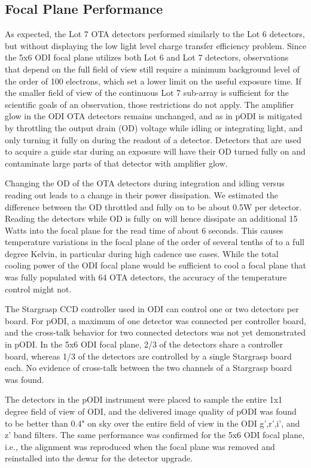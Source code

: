 \documentclass[]{spieman}
\begin{document}
\subsection{Focal Plane  Performance}


As expected, the Lot 7 OTA detectors performed similarly to the Lot 6 detectors, but without
displaying the low light level charge transfer efficiency problem. Since the 5x6
ODI focal plane utilizes both Lot 6 and Lot 7 detectors, observations that
depend on the full field of view still require a minimum background level of the
order of 100 electrons, which set a lower limit on the useful exposure time. If
the smaller field of view of the continuous Lot 7 sub-array is sufficient for the
scientific goals of an observation, those
restrictions do not apply. The amplifier glow in the ODI OTA detectors remains
unchanged, and as in pODI is mitigated by throttling the output drain  (OD) voltage
while idling or integrating light,  and only turning it fully on during the readout
of a detector. Detectors that are used to acquire a guide star during an exposure 
will have their OD turned fully on and contaminate large parts of that detector 
with amplifier glow.

Changing the OD of the OTA detectors during integration and idling versus reading out
leads to a change in their power dissipation. We estimated the difference
between the OD throttled and fully on to be about 0.5W per detector. Reading
the detectors while OD is fully on will hence dissipate an additional 15 Watts
into the focal plane for the read time of about 6 seconds. This causes
temperature variations in the focal plane of the order of several  tenths of
to a full degree Kelvin, in particular during high cadence use cases. While
the total cooling power of the ODI focal plane would be sufficient to cool a
focal plane that was fully populated with 64 OTA detectors, the accuracy of the
temperature control might not.


The Stargrasp CCD controller\cite{onaka2008} used in ODI can control one or two
detectors per board. For pODI, a maximum of one detector was connected per controller 
board, and the cross-talk behavior for two connected detectors was not yet demonstrated
in pODI. In the 5x6 ODI focal plane, 2/3 of the detectors share a controller
board, whereas 1/3 of the detectors are controlled by a single Stargrasp board
each. No evidence of cross-talk between the two channels of a Stargrasp board
was found.

The detectors in the pODI instrument were placed to sample the entire 1x1 degree
field of view of ODI, and the delivered image quality of pODI was found to be
better than 0.4" on sky over the entire field of view in the ODI g',r',i', and
z' band filters. The same performance was confirmed for the 5x6 ODI focal plane,
i.e., the alignment was reproduced when the focal plane was removed and
reinstalled into the dewar for the detector upgrade.
\end{document}
